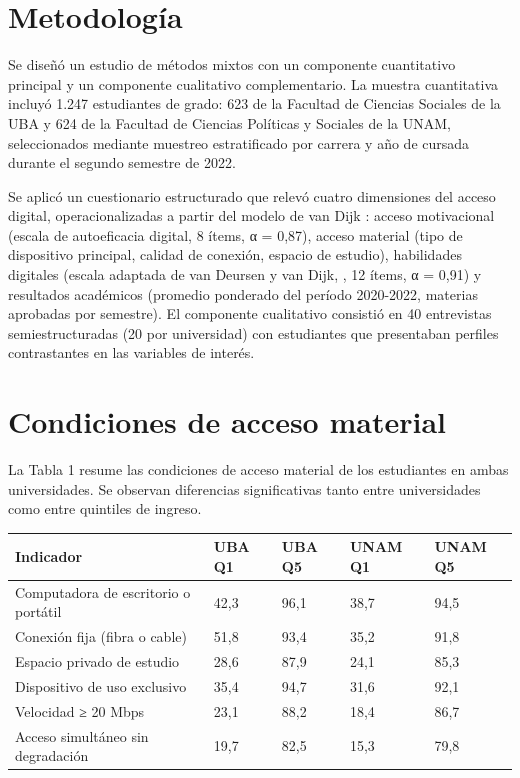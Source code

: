 \section{Metodología}
Se diseñó un estudio de métodos mixtos con un componente cuantitativo principal y un componente cualitativo complementario. La muestra cuantitativa incluyó 1.247 estudiantes de grado: 623 de la Facultad de Ciencias Sociales de la UBA y 624 de la Facultad de Ciencias Políticas y Sociales de la UNAM, seleccionados mediante muestreo estratificado por carrera y año de cursada durante el segundo semestre de 2022.

Se aplicó un cuestionario estructurado que relevó cuatro dimensiones del acceso digital, operacionalizadas a partir del modelo de van Dijk \autocite*{2563-VANDIJK2020}: acceso motivacional (escala de autoeficacia digital, 8 ítems, α = 0,87), acceso material (tipo de dispositivo principal, calidad de conexión, espacio de estudio), habilidades digitales (escala adaptada de van Deursen y van Dijk, \autocite*{2564-VANDEURSEN2019}, 12 ítems, α = 0,91) y resultados académicos (promedio ponderado del período 2020-2022, materias aprobadas por semestre). El componente cualitativo consistió en 40 entrevistas semiestructuradas (20 por universidad) con estudiantes que presentaban perfiles contrastantes en las variables de interés.


\section{Condiciones de acceso material}
La Tabla 1 resume las condiciones de acceso material de los estudiantes en ambas universidades. Se observan diferencias significativas tanto entre universidades como entre quintiles de ingreso.


\begin{table}[!ht]
\centering
{\sf\footnotesize\setlength\tabcolsep{4pt}%
  \begin{tabular}{@{}lllll@{}}
    \toprule
    \textbf{\textbf{Indicador}} & \textbf{\textbf{UBA Q1}} & \textbf{\textbf{UBA Q5}} & \textbf{\textbf{UNAM Q1}} & \textbf{\textbf{UNAM Q5}} \\
    \midrule
    Computadora de escritorio o portátil & 42,3 & 96,1 & 38,7 & 94,5 \\
    \midrule
    Conexión fija (fibra o cable) & 51,8 & 93,4 & 35,2 & 91,8 \\
    \midrule
    Espacio privado de estudio & 28,6 & 87,9 & 24,1 & 85,3 \\
    \midrule
    Dispositivo de uso exclusivo & 35,4 & 94,7 & 31,6 & 92,1 \\
    \midrule
    Velocidad ≥ 20 Mbps & 23,1 & 88,2 & 18,4 & 86,7 \\
    \midrule
    Acceso simultáneo sin degradación & 19,7 & 82,5 & 15,3 & 79,8 \\
    \bottomrule
  \end{tabular}
}%
\label{tbl-1}
\end{table}

